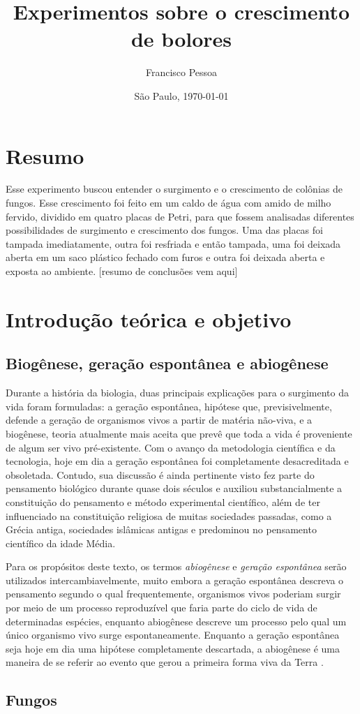 \documentclass[12pt, titlepage]{article}
\author{Francisco Pessoa}
\affil{Colégio Ítaca}
\date{São Paulo, \today}
\title{Experimentos sobre o crescimento de bolores}
\begin{document}
\maketitle

\section*{Resumo}
Esse experimento buscou entender o surgimento e o crescimento de colônias de fungos. Esse crescimento foi feito em um caldo de água com amido de milho fervido, dividido em quatro placas de Petri, para que fossem analisadas diferentes possibilidades de surgimento e crescimento dos fungos. Uma das placas foi tampada imediatamente, outra foi resfriada e então tampada, uma foi deixada aberta em um saco plástico fechado com furos e outra foi deixada aberta e exposta ao ambiente. [resumo de conclusões vem aqui]

\section{Introdução teórica e objetivo}
\subsection{Biogênese, geração espontânea e abiogênese}
Durante a história da biologia, duas principais explicações para o surgimento da vida foram formuladas: a geração espontânea, hipótese que, previsivelmente, defende a geração de organismos vivos a partir de matéria não-viva, e a biogênese, teoria atualmente mais aceita que prevê que toda a vida é proveniente de algum ser vivo pré-existente. Com o avanço da metodologia científica e da tecnologia, hoje em dia a geração espontânea foi completamente desacreditada e obsoletada. Contudo, sua discussão é ainda pertinente visto fez parte do pensamento biológico durante quase dois séculos e auxiliou substancialmente a constituição do pensamento e método experimental científico, além de ter influenciado na constituição religiosa de muitas sociedades passadas, como a Grécia antiga, sociedades islâmicas antigas e predominou no pensamento científico da idade Média.

Para os propósitos deste texto, os termos \textit{abiogênese} e \textit{geração espontânea} serão utilizados intercambiavelmente, muito embora a geração espontânea descreva o pensamento segundo o qual frequentemente, organismos vivos poderiam surgir por meio de um processo reproduzível que faria parte do ciclo de vida de determinadas espécies, enquanto abiogênese descreve um processo pelo qual um único organismo vivo surge espontaneamente. Enquanto a geração espontânea seja hoje em dia uma hipótese completamente descartada, a abiogênese é uma maneira de se referir ao evento que gerou a primeira forma viva da Terra \cite{vlaardingerbroek2010abiogenesis}.

\subsection{Fungos}



\printbibliography
\end{document}
